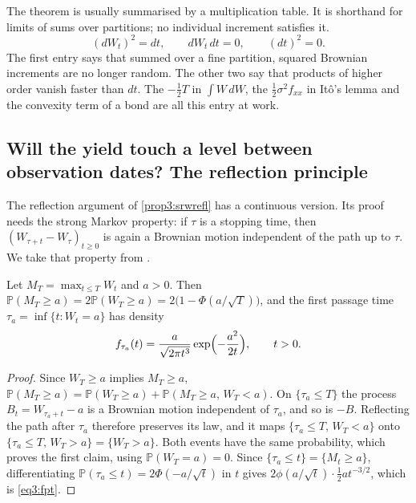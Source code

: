 \begin{chapterrefs}
The theorem is usually summarised by a multiplication table. It is shorthand for limits of sums over
partitions; no individual increment satisfies it.
\begin{equation}\label{eq3:table}
  (dW_t)^2 = dt,\qquad dW_t\,dt = 0,\qquad (dt)^2 = 0 .
\end{equation}
The first entry says that summed over a fine partition, squared Brownian increments are no longer
random. The other two say that products of higher order vanish faster than $dt$. The $-\tfrac12T$ in
$\int W\,dW$, the $\tfrac12\sigma^2f_{xx}$ in It\^o's lemma and the convexity term of a bond are all
this entry at work.

\subsection{Will the yield touch a level between observation dates? The reflection principle}

The reflection argument of \cref{prop3:srwrefl} has a continuous version. Its proof needs the strong
Markov property: if $\tau$ is a stopping time, then $(W_{\tau+t}-W_\tau)_{t\ge0}$ is again a Brownian
motion independent of the path up to $\tau$. We take that property from \textcite[Section~2.6]{karatzas1998}.

\begin{proposition}\label{prop3:bmrefl}
Let $M_T=\max_{t\le T}W_t$ and $a>0$. Then $\mathbb P(M_T\ge a)=2\mathbb P(W_T\ge a)=2\bigl(1-\Phi(a/\sqrt T)\bigr)$, and
the first passage time $\tau_a=\inf\{t:W_t=a\}$ has density
\begin{equation}\label{eq3:fpt}
  f_{\tau_a}(t) = \frac{a}{\sqrt{2\pi t^3}}\exp\Bigl(-\frac{a^2}{2t}\Bigr),\qquad t>0 .
\end{equation}
\end{proposition}

\begin{proof}
Since $W_T\ge a$ implies $M_T\ge a$,
$\mathbb P(M_T\ge a)=\mathbb P(W_T\ge a)+\mathbb P(M_T\ge a,\,W_T<a)$. On $\{\tau_a\le T\}$ the process
$B_t=W_{\tau_a+t}-a$ is a Brownian motion independent of $\tau_a$, and so is $-B$. Reflecting the path
after $\tau_a$ therefore preserves its law, and it maps $\{\tau_a\le T,\,W_T<a\}$ onto
$\{\tau_a\le T,\,W_T>a\}=\{W_T>a\}$. Both events have the same probability, which proves the first claim,
using $\mathbb P(W_T=a)=0$. Since $\{\tau_a\le t\}=\{M_t\ge a\}$, differentiating
$\mathbb P(\tau_a\le t)=2\Phi(-a/\sqrt t)$ in $t$ gives
$2\phi(a/\sqrt t)\cdot\tfrac12 a t^{-3/2}$, which is \cref{eq3:fpt}.
\end{proof}


\end{chapterrefs}
